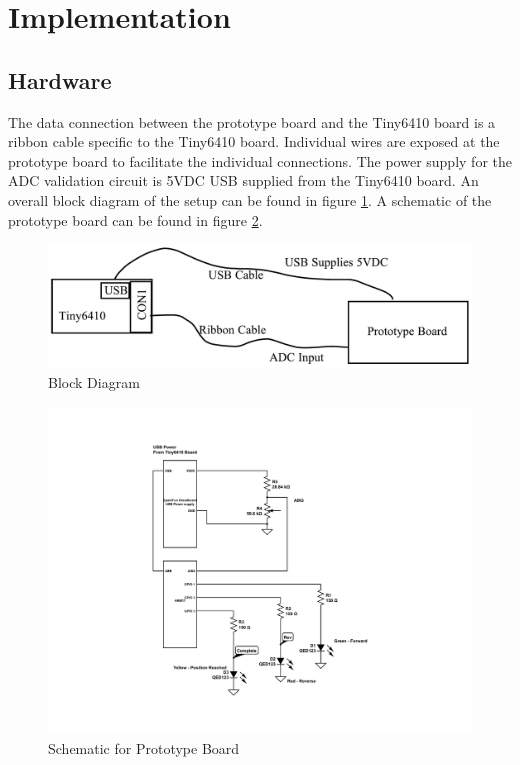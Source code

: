 \documentclass[10pt,conference]{IEEEtran}
\begin{document}
%
%
\section{Implementation}

\subsection{Hardware}
The data connection between the prototype board and the Tiny6410 board is a ribbon cable specific to the Tiny6410 board. Individual wires are exposed at the prototype board to facilitate the individual connections. The power supply for the ADC validation circuit is 5VDC USB supplied from the Tiny6410 board.  An overall block diagram of the setup can be found in figure \ref{BlockDiagram}. A schematic of the prototype board can be found in figure \ref{F:cmpe242_lab3}.

\begin{figure}[ht]
	\includegraphics[scale=.35]{BlockDiagram}
	\caption{Block Diagram}\label{BlockDiagram}
\end{figure}

\begin{figure}[ht]
	\includegraphics[scale=.45]{cmpe242_lab3}
	\caption{Schematic for Prototype Board}\label{F:cmpe242_lab3}
\end{figure}
\end{document}
